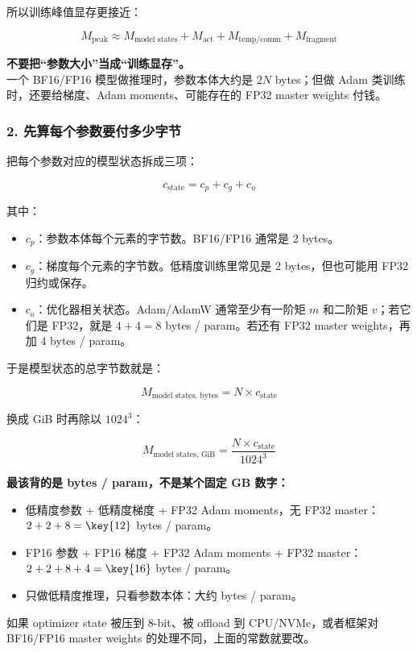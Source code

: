 所以训练峰值显存更接近：

\[
M_{\text{peak}}
\approx
M_{\text{model states}}
+ M_{\text{act}}
+ M_{\text{temp/comm}}
+ M_{\text{fragment}}
\]

\begin{warnbox}
\textbf{不要把“参数大小”当成“训练显存”。}\\
一个 BF16/FP16 模型做推理时，参数本体大约是 $2N$ bytes；但做 Adam 类训练时，还要给梯度、Adam moments、可能存在的 FP32 master weights 付钱。
\end{warnbox}

\subsubsection*{2. 先算每个参数要付多少字节}

把每个参数对应的模型状态拆成三项：

\[
c_{\text{state}} = c_p + c_g + c_o
\]

其中：
\begin{itemize}[leftmargin=1.5em]
  \item $c_p$：参数本体每个元素的字节数。BF16/FP16 通常是 2 bytes。
  \item $c_g$：梯度每个元素的字节数。低精度训练里常见是 2 bytes，但也可能用 FP32 归约或保存。
  \item $c_o$：优化器相关状态。Adam/AdamW 通常至少有一阶矩 $m$ 和二阶矩 $v$；若它们是 FP32，就是 $4 + 4 = 8$ bytes / param。若还有 FP32 master weights，再加 4 bytes / param。
\end{itemize}

于是模型状态的总字节数就是：

\[
M_{\text{model states, bytes}} = N \times c_{\text{state}}
\]

换成 GiB 时再除以 $1024^3$：

\[
M_{\text{model states, GiB}}
=
\frac{N \times c_{\text{state}}}{1024^3}
\]

\begin{intubox}
\textbf{最该背的是 bytes / param，不是某个固定 GB 数字：}
\begin{itemize}[leftmargin=1.5em]
  \item 低精度参数 + 低精度梯度 + FP32 Adam moments，无 FP32 master：$2 + 2 + 8 = \key{12}$ bytes / param。
  \item FP16 参数 + FP16 梯度 + FP32 Adam moments + FP32 master：$2 + 2 + 8 + 4 = \key{16}$ bytes / param。
  \item 只做低精度推理，只看参数本体：大约  bytes / param。
\end{itemize}
如果 optimizer state 被压到 8-bit、被 offload 到 CPU/NVMe，或者框架对 BF16/FP16 master weights 的处理不同，上面的常数就要改。
\end{intubox}

